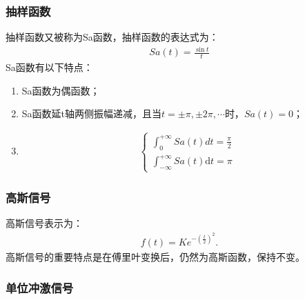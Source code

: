 \documentclass{hitreport}
\begin{document}
\subsubsection{抽样函数}
抽样函数又被称为Sa函数，抽样函数的表达式为：
\begin{align}\label{equ:Sa}
Sa\left(t\right) = \frac{\sin t}{t}
\end{align}
Sa函数有以下特点：
\begin{enumerate}
\item Sa函数为偶函数；
\item Sa函数延t轴两侧振幅递减，且当$t=\pm \pi , \pm 2\pi , \cdots$时，$Sa\left(t\right) = 0$；
\item 
\begin{align}
\left\{ \begin{array}{l}
	\int_{0}^{+\infty}{Sa\left(t\right)d}t = \frac{\pi}{2}\\
	\int_{-\infty}^{+\infty}{Sa\left(t\right)\mathrm{d} t} = \pi
	\end{array} \right.
\end{align}
\end{enumerate}

\subsubsection{高斯信号}
高斯信号表示为：
\begin{align}
f\left(t\right) =  Ke^{-\left(\frac{t}{2}\right)^{2}}.
\end{align}
高斯信号的重要特点是在傅里叶变换后，仍然为高斯函数，保持不变。

\subsubsection{单位冲激信号}
\end{document}
